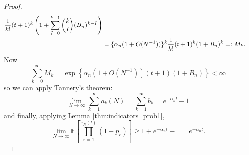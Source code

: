 \documentclass{article}
\newcommand{\Prob}{\mathbb{P}}
\newcommand{\E}{\mathbb{E}}
\newcommand{\I}[1]{\mathbbm{1}_{\{#1\}}}
\newcommand{\1}[1]{\mathbbm{1}_{#1}}
\begin{document}
\begin{proof}
\begin{align}
\frac{1}{k!} (t+1)^k \left( 1+\sum_{I=0}^{k-1} \binom{k}{I} (B_n)^{k-I} \right) \notag\\
&= \{ \alpha_n (1+ O(N^{-1})) \}^k \frac{1}{k!} (t+1)^k (1 + B_n)^k 
=: M_k .
\end{align}
Now
\begin{equation}
\sum_{k=0}^\infty M_k = \exp \left\{ \alpha_n (1+O(N^{-1})) (t+1) (1+B_n) \right\} < \infty
\end{equation}
so we can apply Tannery's theorem:
\begin{equation}\label{eq:26a}
\lim_{N\to\infty} \sum_{k=1}^\infty a_k(N)
= \sum_{k=1}^\infty b_k
= e^{-\alpha_n t} -1
\end{equation}
and finally, applying Lemma \ref{thm:indicators_prob1},
\begin{equation}
\lim_{N\to\infty} \E \left[ \prod_{r=1}^{\tau_N(t)} (1-p_r) \right]
\geq 1 + e^{-\alpha_n t} -1 = e^{-\alpha_n t} .
\end{equation}



\end{proof}
\end{document}
